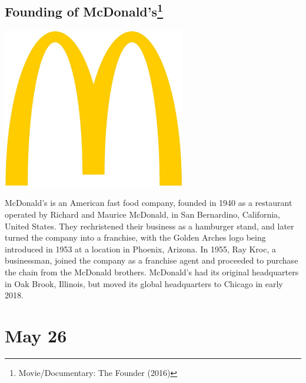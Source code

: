 \documentclass[11pt]{report}
\begin{document}
\subsection{Founding of McDonald's\protect\footnote{Movie/Documentary: The Founder (2016)}}
\vspace{2mm}\begin{center}\includegraphics[width=8cm]{./img/mcdonaldsLogo.jpg}\end{center}
McDonald's is an American fast food company, founded in 1940 as a restaurant operated by Richard and Maurice McDonald, in San Bernardino, California, United States. They rechristened their business as a hamburger stand, and later turned the company into a franchise, with the Golden Arches logo being introduced in 1953 at a location in Phoenix, Arizona. In 1955, Ray Kroc, a businessman, joined the company as a franchise agent and proceeded to purchase the chain from the McDonald brothers. McDonald's had its original headquarters in Oak Brook, Illinois, but moved its global headquarters to Chicago in early 2018.
\section{May 26}
\end{document}

